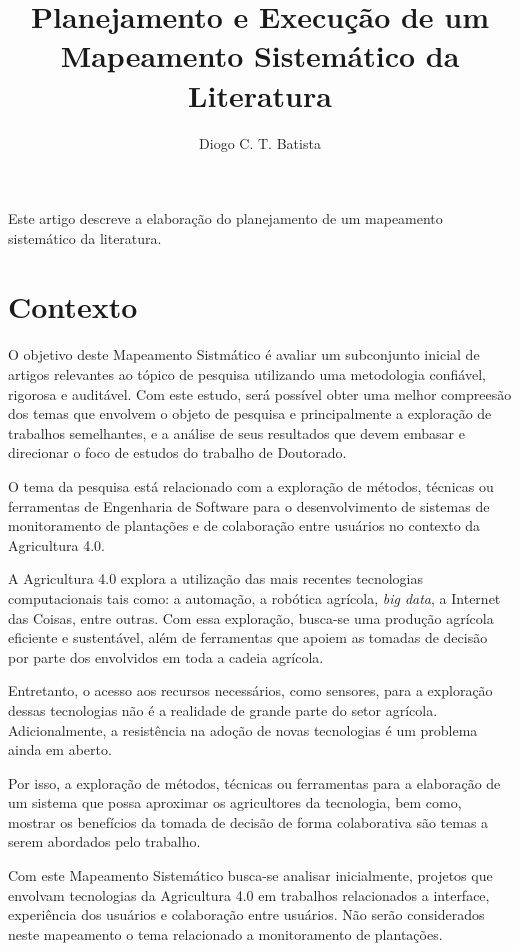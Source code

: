 \documentclass[12pt]{article}
\title{Planejamento e Execução de um Mapeamento Sistemático da Literatura}
\author{Diogo C. T. Batista\inst{1}}
\begin{document}
\maketitle

\begin{resumo}
  Este artigo descreve a elaboração do planejamento de um mapeamento sistemático da literatura.
\end{resumo}


\section{Contexto}

O objetivo deste Mapeamento Sistmático é avaliar um subconjunto inicial de artigos relevantes ao tópico de pesquisa utilizando uma metodologia confiável, rigorosa e auditável. Com este estudo, será possível obter uma melhor compreesão dos temas que envolvem o objeto de pesquisa e principalmente a exploração de trabalhos semelhantes, e a análise de seus resultados que devem embasar e direcionar o foco de estudos do trabalho de Doutorado.

O tema da pesquisa está relacionado com a exploração de métodos, técnicas ou ferramentas de Engenharia de Software para o desenvolvimento de sistemas de monitoramento de plantações e de colaboração entre usuários no contexto da Agricultura 4.0.

A Agricultura 4.0 explora a utilização das mais recentes tecnologias computacionais tais como: a automação, a robótica agrícola, \textit{big data}, a Internet das Coisas, entre outras. Com essa exploração, busca-se uma produção agrícola eficiente e sustentável, além de ferramentas que apoiem as tomadas de decisão por parte dos envolvidos em toda a cadeia agrícola.

Entretanto, o acesso aos recursos necessários, como sensores, para a exploração dessas tecnologias não é a realidade de grande parte do setor agrícola. Adicionalmente, a resistência na adoção de novas tecnologias é um problema ainda em aberto.

Por isso, a exploração de métodos, técnicas ou ferramentas para a elaboração de um sistema que possa aproximar os agricultores da tecnologia, bem como, mostrar os benefícios da tomada de decisão de forma colaborativa são temas a serem abordados pelo trabalho.

Com este Mapeamento Sistemático busca-se analisar inicialmente, projetos que envolvam tecnologias da Agricultura 4.0 em trabalhos relacionados a interface, experiência dos usuários e colaboração entre usuários. Não serão considerados neste mapeamento o tema relacionado a monitoramento de plantações.
\end{document}
